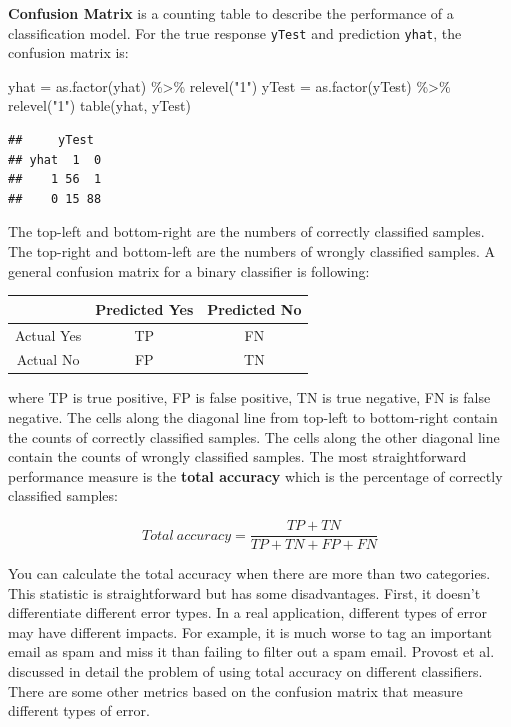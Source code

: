 \documentclass[
  12pt,
]{krantz}
\makeatletter
\newenvironment{Shaded}{\begin{snugshade}}{\end{snugshade}}
\newcommand{\FunctionTok}[1]{\textcolor[rgb]{0,0,0}{#1}}
\newcommand{\NormalTok}[1]{#1}
\newcommand{\OtherTok}[1]{\textcolor[rgb]{0.37,0.37,0.37}{#1}}
\newcommand{\SpecialCharTok}[1]{\textcolor[rgb]{0,0,0}{#1}}
\newcommand{\StringTok}[1]{\textcolor[rgb]{0.5,0.5,0.5}{#1}}
\newenvironment{kframe}{%
\medskip{}
\setlength{\fboxsep}{.8em}
 \def\at@end@of@kframe{}%
 \ifinner\ifhmode%
  \def\at@end@of@kframe{\end{minipage}}%
  \begin{minipage}{\columnwidth}%
 \fi\fi%
 \def\FrameCommand##1{\hskip\@totalleftmargin \hskip-\fboxsep
 \colorbox{shadecolor}{##1}\hskip-\fboxsep
     \hskip-\linewidth \hskip-\@totalleftmargin \hskip\columnwidth}%
 \MakeFramed {\advance\hsize-\width
   \@totalleftmargin\z@ \linewidth\hsize
   \@setminipage}}%
 {\par\unskip\endMakeFramed%
 \at@end@of@kframe}
\renewenvironment{Shaded}{\begin{kframe}}{\end{kframe}}
\makeatother
\begin{document}
\textbf{Confusion Matrix} is a counting table to describe the performance of a classification model. For the true response \texttt{yTest} and prediction \texttt{yhat}, the confusion matrix is:

\begin{Shaded}
\begin{Highlighting}[]
\NormalTok{yhat }\OtherTok{=} \FunctionTok{as.factor}\NormalTok{(yhat) }\SpecialCharTok{\%\textgreater{}\%} \FunctionTok{relevel}\NormalTok{(}\StringTok{"1"}\NormalTok{)}
\NormalTok{yTest }\OtherTok{=} \FunctionTok{as.factor}\NormalTok{(yTest) }\SpecialCharTok{\%\textgreater{}\%} \FunctionTok{relevel}\NormalTok{(}\StringTok{"1"}\NormalTok{)}
\FunctionTok{table}\NormalTok{(yhat, yTest)}
\end{Highlighting}
\end{Shaded}

\begin{verbatim}
##     yTest
## yhat  1  0
##    1 56  1
##    0 15 88
\end{verbatim}

The top-left and bottom-right are the numbers of correctly classified samples. The top-right and bottom-left are the numbers of wrongly classified samples. A general confusion matrix for a binary classifier is following:

\begin{longtable}[]{@{}ccc@{}}
\toprule
& Predicted Yes & Predicted No \\
\midrule
\endhead
Actual Yes & TP & FN \\
Actual No & FP & TN \\
\bottomrule
\end{longtable}

where TP is true positive, FP is false positive, TN is true negative, FN is false negative. The cells along the diagonal line from top-left to bottom-right contain the counts of correctly classified samples. The cells along the other diagonal line contain the counts of wrongly classified samples. The most straightforward performance measure is the \textbf{total accuracy} which is the percentage of correctly classified samples:

\[Total\ accuracy = \frac{TP+TN}{TP+TN+FP+FN}\]

You can calculate the total accuracy when there are more than two categories. This statistic is straightforward but has some disadvantages. First, it doesn't differentiate different error types. In a real application, different types of error may have different impacts. For example, it is much worse to tag an important email as spam and miss it than failing to filter out a spam email. Provost et al. \citep{Provost1998} discussed in detail the problem of using total accuracy on different classifiers. There are some other metrics based on the confusion matrix that measure different types of error.
\end{document}
